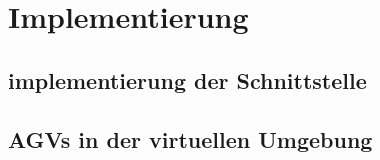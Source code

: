 \chapter{Implementierung}
\section{implementierung der Schnittstelle}
\section{AGVs in der virtuellen Umgebung}